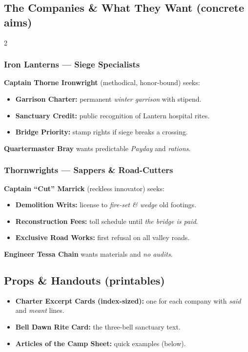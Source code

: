 \documentclass[11pt]{article}
\begin{document}
\subsection*{The Companies \& What They Want (concrete aims)}
\begin{multicols}{2}
\subsubsection*{Iron Lanterns --- Siege Specialists}
\textbf{Captain Thorne Ironwright} (methodical, honor-bound) seeks:
\begin{itemize}[leftmargin=*]
  \item \textbf{Garrison Charter:} permanent \emph{winter garrison} with stipend.
  \item \textbf{Sanctuary Credit:} public recognition of Lantern hospital rites.
  \item \textbf{Bridge Priority:} stamp rights if siege breaks a crossing.
\end{itemize}
\textbf{Quartermaster Bray} wants predictable \emph{Payday} and \emph{rations}.
\columnbreak
\subsubsection*{Thornwrights --- Sappers \& Road-Cutters}
\textbf{Captain ``Cut'' Marrick} (reckless innovator) seeks:
\begin{itemize}[leftmargin=*]
  \item \textbf{Demolition Writs:} license to \emph{fire-set \& wedge} old footings.
  \item \textbf{Reconstruction Fees:} toll schedule until \emph{the bridge is paid}.
  \item \textbf{Exclusive Road Works:} first refusal on all valley roads.
\end{itemize}
\textbf{Engineer Tessa Chain} wants materials and \emph{no audits}.
\end{multicols}

\subsection*{Props \& Handouts (printables)}
\begin{itemize}[leftmargin=*]
  \item \textbf{Charter Excerpt Cards (index-sized):} one for each company with \emph{said} and \emph{meant} lines.
  \item \textbf{Bell Dawn Rite Card:} the three-bell sanctuary text.
  \item \textbf{Articles of the Camp Sheet:} quick examples (below).
\end{itemize}
\end{document}
